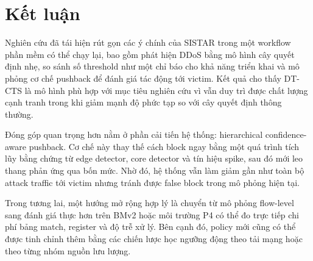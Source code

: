 \section{Kết luận}

Nghiên cứu đã tái hiện rút gọn các ý chính của SISTAR trong một workflow phần mềm có thể chạy lại, bao gồm phát hiện DDoS bằng mô hình cây quyết định nhẹ, so sánh số threshold như một chỉ báo cho khả năng triển khai và mô phỏng cơ chế pushback để đánh giá tác động tới victim. Kết quả cho thấy DT-CTS là mô hình phù hợp với mục tiêu nghiên cứu vì vẫn duy trì được chất lượng cạnh tranh trong khi giảm mạnh độ phức tạp so với cây quyết định thông thường.

Đóng góp quan trọng hơn nằm ở phần cải tiến hệ thống: hierarchical confidence-aware pushback. Cơ chế này thay thế cách block ngay bằng một quá trình tích lũy bằng chứng từ edge detector, core detector và tín hiệu spike, sau đó mới leo thang phản ứng qua bốn mức. Nhờ đó, hệ thống vẫn làm giảm gần như toàn bộ attack traffic tới victim nhưng tránh được false block trong mô phỏng hiện tại.

Trong tương lai, một hướng mở rộng hợp lý là chuyển từ mô phỏng flow-level sang đánh giá thực hơn trên BMv2 hoặc môi trường P4 có thể đo trực tiếp chi phí bảng match, register và độ trễ xử lý. Bên cạnh đó, policy mới cũng có thể được tinh chỉnh thêm bằng các chiến lược học ngưỡng động theo tải mạng hoặc theo từng nhóm nguồn lưu lượng.
